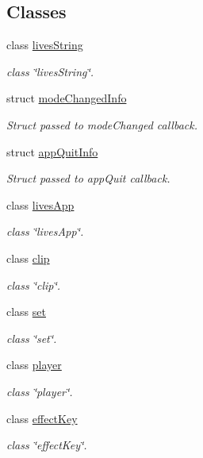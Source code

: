 \subsection*{Classes}
\begin{DoxyCompactItemize}
\item 
class \hyperlink{classlives_1_1livesString}{lives\-String}
\begin{DoxyCompactList}\small\item\em class \char`\"{}lives\-String\char`\"{}. \end{DoxyCompactList}\item 
struct \hyperlink{structlives_1_1modeChangedInfo}{mode\-Changed\-Info}
\begin{DoxyCompactList}\small\item\em Struct passed to mode\-Changed callback. \end{DoxyCompactList}\item 
struct \hyperlink{structlives_1_1appQuitInfo}{app\-Quit\-Info}
\begin{DoxyCompactList}\small\item\em Struct passed to app\-Quit callback. \end{DoxyCompactList}\item 
class \hyperlink{classlives_1_1livesApp}{lives\-App}
\begin{DoxyCompactList}\small\item\em class \char`\"{}lives\-App\char`\"{}. \end{DoxyCompactList}\item 
class \hyperlink{classlives_1_1clip}{clip}
\begin{DoxyCompactList}\small\item\em class \char`\"{}clip\char`\"{}. \end{DoxyCompactList}\item 
class \hyperlink{classlives_1_1set}{set}
\begin{DoxyCompactList}\small\item\em class \char`\"{}set\char`\"{}. \end{DoxyCompactList}\item 
class \hyperlink{classlives_1_1player}{player}
\begin{DoxyCompactList}\small\item\em class \char`\"{}player\char`\"{}. \end{DoxyCompactList}\item 
class \hyperlink{classlives_1_1effectKey}{effect\-Key}
\begin{DoxyCompactList}\small\item\em class \char`\"{}effect\-Key\char`\"{}. \end{DoxyCompactList}\item 

\end{DoxyCompactItemize}
